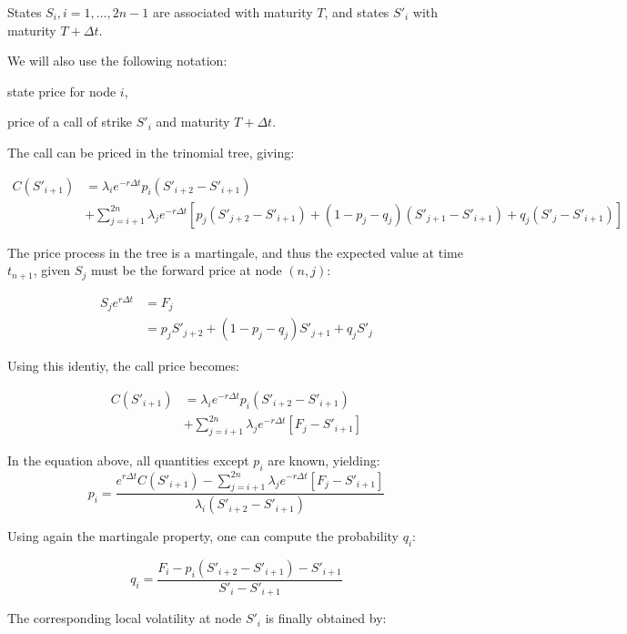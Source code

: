 \documentclass[]{tufte-book}
\providecommand{\tightlist}{%
  \setlength{\itemsep}{0pt}\setlength{\parskip}{0pt}}
\begin{document}
States \(S_i, i=1, \ldots, 2n-1\) are associated with maturity \(T\), and states \(S'_i\) with
maturity \(T+\Delta t\).

We will also use the following notation:

\begin{description}
\tightlist
\item[\(\lambda_i\)]
state price for node \(i\),
\item[\(C(S'_i)\)]
price of a call of strike \(S'_i\) and maturity \(T+\Delta t\).
\end{description}

The call can be priced in the trinomial tree, giving:

\begin{align}
C(S'_{i+1}) &= \lambda_i e^{-r\Delta t} p_i (S'_{i+2} - S'_{i+1}) \\
& + \sum_{j=i+1}^{2n} \lambda_j e^{-r\Delta t} \left[ p_j (S'_{j+2} -S'_{i+1}) + (1-p_j-q_j)  (S'_{j+1} -S'_{i+1}) + q_j  (S'_{j} -S'_{i+1}) \right]
\end{align}

The price process in the tree is a martingale, and thus the expected value at time \(t_{n+1}\), given \(S_j\) must be the forward price at node
\((n,j)\):

\begin{align}
S_j e^{r \Delta t} &= F_j \\
&= p_j S'_{j+2} + (1-p_j-q_j)  S'_{j+1} + q_j  S'_{j}
\end{align}

Using this identiy, the call price becomes:

\begin{align}
C(S'_{i+1}) &= \lambda_i e^{-r\Delta t} p_i (S'_{i+2} - S'_{i+1}) \\
& + \sum_{j=i+1}^{2n} \lambda_j e^{-r\Delta t} \left[ F_j - S'_{i+1} \right]
\end{align}

In the equation above, all quantities except \(p_i\) are known, yielding:
\[
p_i = \frac{e^{r\Delta t} C(S'_{i+1}) - \sum_{j=i+1}^{2n} \lambda_j e^{-r\Delta t} \left[ F_j - S'_{i+1} \right]}{\lambda_i(S'_{i+2} - S'_{i+1})}
\label{eq:trinomial-pi}
\]

Using again the martingale property, one can compute the probability
\(q_i\):

\[
q_i = \frac{F_i - p_i (S'_{i+2} - S'_{i+1}) - S'_{i+1}}{S'_i - S'_{i+1}}
\label{eq:trinomial-qi}
\]

The corresponding local volatility at node \(S'_i\) is finally obtained
by:
\end{document}
